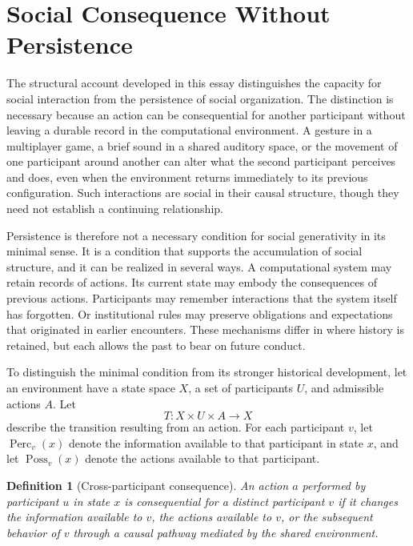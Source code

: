 \documentclass[11pt]{article}
\newtheorem{definition}{Definition}
\theoremstyle{remark}
\begin{document}
\section{Social Consequence Without Persistence}
\label{sec:transient-sociality}

The structural account developed in this essay distinguishes the
capacity for social interaction from the persistence of social
organization. The distinction is necessary because an action can
be consequential for another participant without leaving a
durable record in the computational environment. A gesture in a
multiplayer game, a brief sound in a shared auditory space, or
the movement of one participant around another can alter what
the second participant perceives and does, even when the
environment returns immediately to its previous configuration.
Such interactions are social in their causal structure, though
they need not establish a continuing relationship.

Persistence is therefore not a necessary condition for social
generativity in its minimal sense. It is a condition that
supports the accumulation of social structure, and it can be
realized in several ways. A computational system may retain
records of actions. Its current state may embody the
consequences of previous actions. Participants may remember
interactions that the system itself has forgotten. Or
institutional rules may preserve obligations and expectations
that originated in earlier encounters. These mechanisms differ
in where history is retained, but each allows the past to bear
on future conduct.

To distinguish the minimal condition from its stronger
historical development, let an environment have a state space
$X$, a set of participants $U$, and admissible actions $A$.
Let
\[
T:X\times U\times A\longrightarrow X
\]
describe the transition resulting from an action. For each
participant $v$, let $\operatorname{Perc}_v(x)$ denote the
information available to that participant in state $x$, and
let $\operatorname{Poss}_v(x)$ denote the actions available to
that participant.

\begin{definition}[Cross-participant consequence]
An action $a$ performed by participant $u$ in state $x$ is
\emph{consequential for} a distinct participant $v$ if it
changes the information available to $v$, the actions
available to $v$, or the subsequent behavior of $v$ through
a causal pathway mediated by the shared environment.
\end{definition}
\end{document}
